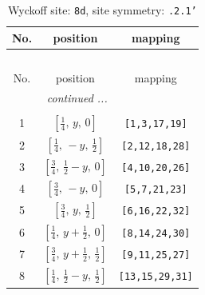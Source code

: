 \documentclass[fleqn,8pt]{jsarticle}
\begin{document}
\begin{longtable}{ccc}
\caption{Wyckoff site: {\tt 8d}, site symmetry: {\tt .2.1'}}
 \\
 \hline \hline
No. & position & mapping \\ \hline \endfirsthead

\multicolumn{2}{l}{\tablename\ \thetable{}} \\
 \hline \hline
No. & position & mapping \\ \hline \endhead

 \hline \hline
\multicolumn{2}{r}{\footnotesize\it continued ...} \\ \endfoot

 \hline \hline
\multicolumn{2}{r}{} \\ \endlastfoot

1 & $\left[ \frac{1}{4},\, y,\, 0 \right]$ & {\tt [1,3,17,19]} \\ \hline
2 & $\left[ \frac{1}{4},\, - y,\, \frac{1}{2} \right]$ & {\tt [2,12,18,28]} \\ \hline
3 & $\left[ \frac{3}{4},\, \frac{1}{2} - y,\, 0 \right]$ & {\tt [4,10,20,26]} \\ \hline
4 & $\left[ \frac{3}{4},\, - y,\, 0 \right]$ & {\tt [5,7,21,23]} \\ \hline
5 & $\left[ \frac{3}{4},\, y,\, \frac{1}{2} \right]$ & {\tt [6,16,22,32]} \\ \hline
6 & $\left[ \frac{1}{4},\, y + \frac{1}{2},\, 0 \right]$ & {\tt [8,14,24,30]} \\ \hline
7 & $\left[ \frac{3}{4},\, y + \frac{1}{2},\, \frac{1}{2} \right]$ & {\tt [9,11,25,27]} \\ \hline
8 & $\left[ \frac{1}{4},\, \frac{1}{2} - y,\, \frac{1}{2} \right]$ & {\tt [13,15,29,31]} \\
\end{longtable}
\renewcommand{\arraystretch}{1.2}
\end{document}
